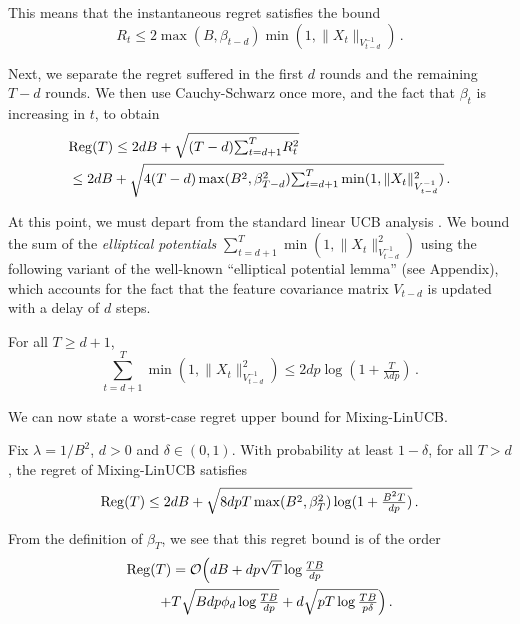This means that the instantaneous regret satisfies the bound
\begin{equation}
R_t \leq 2\max(B, \beta_{t-d})\min(1, \|X_t\|_{V_{t-d}^{-1}})\,.\label{eqn:inst_reg}
\end{equation}

Next, we separate the regret suffered in the first $d$ rounds and the remaining $T-d$ rounds. We then use Cauchy-Schwarz once more, and the fact that $\beta_{t}$ is increasing in $t$, to obtain
\begin{align*}
&\mathrm{Reg}(T) \leq 2dB + \sqrt{(T-d){\textstyle\sum_{t=d+1}^{T}}R_t^2}\\
&\leq 2dB + \sqrt{4(T-d)\max(B^2, \beta_{T-d}^2){\textstyle\sum_{t=d+1}^{T}}\min(1, \|X_t\|_{V_{t-d}^{-1}}^2)}\,.
\end{align*}

At this point, we must depart from the standard linear UCB analysis \citep{abbasi2011improved, lattimore2020bandit}. We bound the sum of the \emph{elliptical potentials} $\sum_{t=d+1}^{T}\min(1, \|X_t\|_{V_{t-d}^{-1}}^2)$ using the following variant of the well-known ``elliptical potential lemma'' (see Appendix), which accounts for the fact that the feature covariance matrix $V_{t-d}$ is updated with a delay of $d$ steps.
\begin{lemma}
For all $T \geq d+1$,
\begin{equation*}
\sum_{t=d+1}^{T}\min(1, \|X_t\|_{V_{t-d}^{-1}}^2) \leq 2dp\log(1 + \tfrac{T}{\lambda dp})\,.
\end{equation*}
\label{lem:delay_elliptical}
\end{lemma}

We can now state a worst-case regret upper bound for Mixing-LinUCB.


\begin{theorem}
\label{theorem:regret_bound}

Fix $\lambda = 1/B^2$, $d>0$ and $\delta\in(0,1)$. With probability at least $1 - \delta$, for all $T > d$, the regret of Mixing-LinUCB satisfies
\begin{align*}
\mathrm{Reg}(T) \leq 2dB + \sqrt{8dpT\max(B^2, \beta_{T}^2)\log(1 + \tfrac{B^2T}{dp})}\,.
\end{align*}
\label{thm:worst_case_reg}
\end{theorem}

From the definition of $\beta_T$, we see that this regret bound is of the order
\begin{align*}
\mathrm{Reg}(T)  &= \mathcal{O}\Big(dB + dp\sqrt{T}\log\tfrac{TB}{dp} \\+& T\sqrt{Bdp\phi_d\log\tfrac{TB}{dp}} + d\sqrt{pT\log\tfrac{TB}{p\delta}}\Big)\,.
\end{align*}

